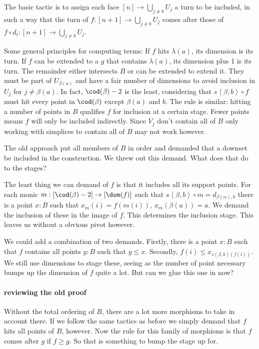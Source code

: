 \documentclass{tac}
\newcommand\of{:}
\newcommand\tuplet[1]{\left\langle #1 \right\rangle}
\begin{document}
The basic tactic is to assign each face $[n]\to\bigcup_{j\neq b}U_j$ a turn to be included, in such a way that the turn of $f:[n + 1]\to\bigcup_{j\neq b}U_j$ comes after those of $f\circ d_i:[n + 1]\to\bigcup_{j\neq b}U_j$.

Some general principles for computing terms: 
If $f$ hits $\lambda(a)$, its dimension is its turn.
If $f$ can be extended to a $g$ that contains $\lambda(a)$, its dimension plus 1 is its turn.
The remainder either intersects $B$ or can be extended to extend it. They must be part of $U_{\beta(a)}$ and have a fair number of dimensions to avoid inclusion in $U_j$ for $j\neq \beta(a)$. In fact, $\cod(\beta) - 2$ is the least, considering that $s\tuplet{\beta,b}\circ f$ must hit every point in $\cod(\beta)$ except $\beta(a)$ and $b$.
The rule is similar: hitting a number of points in $B$ qualifies $f$ for inclusion at a certain stage. Fewer points means $f$ will only be included indirectly. Since $V_j$ don't contain all of $B$ only working with simplices to contain all of $B$ may not work however.

The old approach put all members of $B$ in order and demanded that a downset be included in the construction. We threw out this demand. What does that do to the stages?

The least thing we can demand of $f$ is that it includes all its support points. For each monic $m\of[\cod(\beta) - 2]\to [\dom(f)]$ such that $s\tuplet{\beta,b}\circ m = d_{\beta(\alpha), b}$ there is a point $x\of B$ such that $x_m(i) = f(m(i))$, $x_m(\beta(a)) = a$. We demand the inclusion of these in the image of $f$. This determines the inclusion stage.
This leaves us without a obvious pivot however.

We could add a combination of two demands. Firstly, there is a point $x\of B$ such that $f$ contains all points $y\of B$ such that $y\leq x$.
Secondly, $f(i) \leq x_{s(\beta,b)(f(i))}$. We still use dimensions to stage these, seeing as the number of point necessary bumps up the dimension of $f$ quite a lot. But can we glue this one in now?
 
\paragraph{reviewing the old proof}
Without the total ordering of $B$, there are a lot more morphisms to take in account there. If we follow the same tactics as before we simply demand that $f$ hits all points of $B$, however.
Now the rule for this family of morphisms is that $f$ comes after $g$ if $f\geq g$. So that is something to bump the stage up for.
\end{document}
